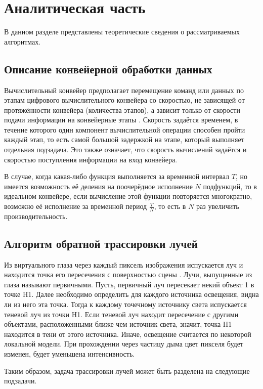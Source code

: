\chapter{Аналитическая часть}
В данном разделе представлены теоретические сведения о рассматриваемых алгоритмах.

\section{Описание конвейерной обработки данных}

Вычислительный конвейер предполагает перемещение команд или данных по этапам цифрового вычислительного конвейера со скоростью, не зависящей от протяжённости конвейера (количества этапов), а зависит только от скорости подачи информации на конвейерные этапы \cite{conveyor}. 
Скорость задаётся временем, в течение которого один компонент вычислительной операции способен пройти каждый этап, то есть самой большой задержкой на этапе, который выполняет отдельная подзадача. 
Это также означает, что скорость вычислений задаётся и скоростью поступления информации на вход конвейера.

В случае, когда какая-либо функция выполняется за временной интервал $T$, но имеется возможность её деления на поочерёдное исполнение $N$ подфункций, то в идеальном конвейере, если вычисление этой функции повторяется многократно, возможно её исполнение за временной период $\frac{T}{N}$, то есть в $N$ раз увеличить производительность. 

\section{Алгоритм обратной трассировки лучей}
Из виртуального глаза через каждый пиксель изображения испускается луч и находится точка его пересечения с поверхностью сцены \cite{raytrace}.
Лучи, выпущенные из глаза называют первичными. 
Пусть, первичный луч пересекает некий объект 1 в точке H1.
Далее необходимо определить для каждого источника освещения, видна ли из него эта точка. 
Тогда к каждому точечному источнику света испускается теневой луч из точки H1.  
Если теневой луч находит пересечение с другими объектами, расположенными ближе чем источник света, значит, точка H1 находится в тени от этого источника. 
Иначе, освещение считается по некоторой локальной модели. 
При прохождении через частицу дыма цвет пикселя будет изменен, будет уменьшена интенсивность.

Таким образом, задача трассировки лучей может быть разделена на следующие подзадачи.

